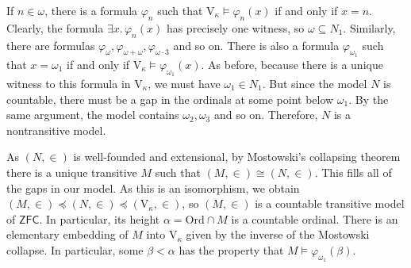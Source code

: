 If \( n \in \omega \), there is a formula \( \varphi_n \) such that \( \mathrm{V}_\kappa \vDash \varphi_n(x) \) if and only if \( x = n \).
Clearly, the formula \( \exists x.\, \varphi_n(x) \) has precisely one witness, so \( \omega \subseteq N_1 \).
Similarly, there are formulas \( \varphi_\omega, \varphi_{\omega + \omega}, \varphi_{\omega \cdot 3} \) and so on.
There is also a formula \( \varphi_{\omega_1} \) such that \( x = \omega_1 \) if and only if \( \mathrm{V}_\kappa \vDash \varphi_{\omega_1}(x) \).
As before, because there is a unique witness to this formula in \( \mathrm{V}_\kappa \), we must have \( \omega_1 \in N_1 \).
But since the model \( N \) is countable, there must be a gap in the ordinals at some point below \( \omega_1 \).
By the same argument, the model contains \( \omega_2, \omega_3 \) and so on.
Therefore, \( N \) is a nontransitive model.

As \( (N, \in) \) is well-founded and extensional, by Mostowski's collapsing theorem there is a unique transitive \( M \) such that \( (M, \in) \cong (N, \in) \).
This fills all of the gaps in our model.
As this is an isomorphism, we obtain \( (M, \in) \preceq (N, \in) \preceq (\mathrm{V}_\kappa, \in) \), so \( (M, \in) \) is a countable transitive model of \( \mathsf{ZFC} \).
In particular, its height \( \alpha = \mathrm{Ord} \cap M \) is a countable ordinal.
There is an elementary embedding of \( M \) into \( \mathrm{V}_\kappa \) given by the inverse of the Mostowski collapse.
In particular, some \( \beta < \alpha \) has the property that \( M \vDash \varphi_{\omega_1}(\beta) \).

